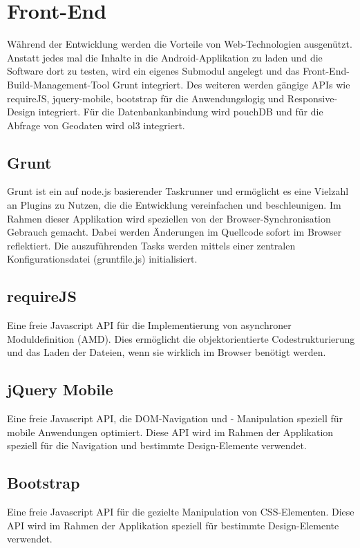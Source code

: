 \section{Front-End}
\label{sec:frontend}
Während der Entwicklung werden die Vorteile von Web-Technologien ausgenützt. Anstatt jedes mal die Inhalte in die Android-Applikation zu laden und die Software dort zu testen, wird ein eigenes Submodul angelegt und das Front-End-Build-Management-Tool Grunt integriert. Des weiteren werden gängige APIs wie requireJS, jquery-mobile, bootstrap für die Anwendungslogig und Responsive-Design integriert. Für die Datenbankanbindung wird pouchDB und für die Abfrage von Geodaten wird ol3 integriert.

\subsection{Grunt}
\label{subsec:grunt}
Grunt ist ein auf node.js basierender Taskrunner und ermöglicht es eine Vielzahl an Plugins zu Nutzen, die die Entwicklung vereinfachen und beschleunigen. Im Rahmen dieser Applikation wird speziellen von der Browser-Synchronisation Gebrauch gemacht. Dabei werden Änderungen im Quellcode sofort im Browser reflektiert. Die auszuführenden Tasks werden mittels einer zentralen Konfigurationsdatei (gruntfile.js) initialisiert. 

\subsection{requireJS}
\label{subsec:requirejs}
Eine freie Javascript API für die Implementierung von asynchroner Moduldefinition (AMD). Dies ermöglicht die objektorientierte Codestrukturierung und das Laden der Dateien, wenn sie wirklich im Browser benötigt werden.

\subsection{jQuery Mobile}
\label{subsec:jquery}
Eine freie Javascript API, die DOM-Navigation und - Manipulation speziell für mobile Anwendungen optimiert. Diese API wird im Rahmen der Applikation speziell für die Navigation und bestimmte Design-Elemente verwendet.

\subsection{Bootstrap}
\label{subsec:jquery}
Eine freie Javascript API für die gezielte Manipulation von CSS-Elementen. Diese API wird im Rahmen der Applikation speziell für bestimmte Design-Elemente verwendet.

